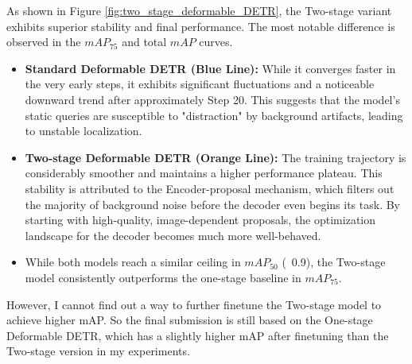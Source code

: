 \documentclass[a4paper]{article} %
\begin{document}
As shown in Figure \ref{fig:two_stage_deformable_DETR}, the Two-stage variant exhibits superior stability and final performance. The most notable difference is observed in the $mAP_{75}$ and total $mAP$ curves.

\begin{itemize}
    \item \textbf{Standard Deformable DETR (Blue Line): }While it converges faster in the very early steps, it exhibits significant fluctuations and a noticeable downward trend after approximately Step 20. This suggests that the model's static queries are susceptible to "distraction" by background artifacts, leading to unstable localization.
    \item \textbf{Two-stage Deformable DETR (Orange Line): }The training trajectory is considerably smoother and maintains a higher performance plateau. This stability is attributed to the Encoder-proposal mechanism, which filters out the majority of background noise before the decoder even begins its task. By starting with high-quality, image-dependent proposals, the optimization landscape for the decoder becomes much more well-behaved.
    \item While both models reach a similar ceiling in $mAP_{50}$ (~0.9), the Two-stage model consistently outperforms the one-stage baseline in $mAP_{75}$.
\end{itemize}

However, I cannot find out a way to further finetune the Two-stage model to achieve higher mAP. So the final submission is still based on the One-stage Deformable DETR, which has a slightly higher mAP after finetuning than the Two-stage version in my experiments.



\printbibliography %
\end{document}
